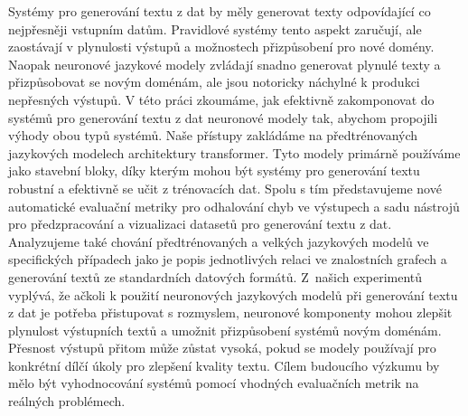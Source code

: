 Systémy pro generování textu z dat by měly generovat texty odpovídající co nejpřesněji vstupním datům. Pravidlové systémy tento aspekt zaručují, ale zaostávají v plynulosti výstupů a možnostech přizpůsobení pro nové domény. Naopak neuronové jazykové modely zvládají snadno generovat plynulé texty a přizpůsobovat se novým doménám, ale jsou notoricky náchylné k produkci nepřesných výstupů. V této práci zkoumáme, jak efektivně zakomponovat do systémů pro generování textu z dat neuronové modely tak, abychom propojili výhody obou typů systémů. Naše přístupy zakládáme na předtrénovaných jazykových modelech architektury transformer. Tyto modely primárně používáme jako stavební bloky, díky kterým mohou být systémy pro generování textu robustní a efektivně se učit z trénovacích dat. Spolu s tím představujeme nové automatické evaluační metriky pro odhalování chyb ve výstupech a sadu nástrojů pro předzpracování a vizualizaci datasetů pro generování textu z dat. Analyzujeme také chování předtrénovaných a velkých jazykových modelů ve specifických případech jako je popis jednotlivých relaci ve znalostních grafech a generování textů ze standardních datových formátů. Z~našich experimentů vyplývá, že ačkoli k použití neuronových jazykových modelů při generování textu z dat je potřeba přistupovat s rozmyslem, neuronové komponenty mohou zlepšit plynulost výstupních textů a umožnit přizpůsobení systémů novým doménám. Přesnost výstupů přitom může zůstat vysoká, pokud se modely používají pro konkrétní dílčí úkoly pro zlepšení kvality textu. Cílem budoucího výzkumu by mělo být vyhodnocování systémů pomocí vhodných evaluačních metrik na reálných problémech.